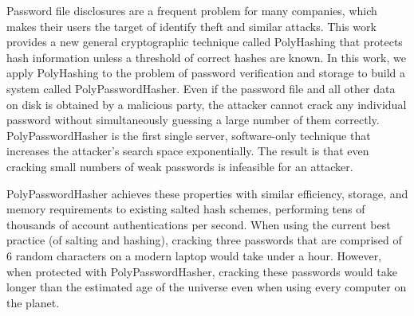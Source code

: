 Password file disclosures are a frequent problem for many companies, which
makes their users the target of identify theft and similar attacks.   This 
work provides a new general cryptographic technique called PolyHashing that 
protects hash information unless a threshold of correct hashes are known.
In this work, we apply PolyHashing to the problem of password verification and 
storage to build a system called PolyPasswordHasher. %
Even if the password file and all other data on disk is obtained by a 
malicious party, the attacker cannot crack any individual password without 
simultaneously guessing a large number of them correctly.   PolyPasswordHasher
is the first single server, software-only technique that increases
the attacker's search space exponentially.   The result is that even cracking 
small numbers of weak passwords is infeasible for an attacker.   

PolyPasswordHasher achieves these properties with similar efficiency, storage,
and memory requirements to existing salted hash schemes,
performing
tens of thousands of account authentications per second.    
When using the current best practice (of salting and hashing), 
cracking three passwords that are comprised of 6 random characters on
a modern laptop would take under a hour.  However, when protected with
PolyPasswordHasher, cracking these passwords would take longer than the estimated 
age of the universe even when using every computer on the planet.
